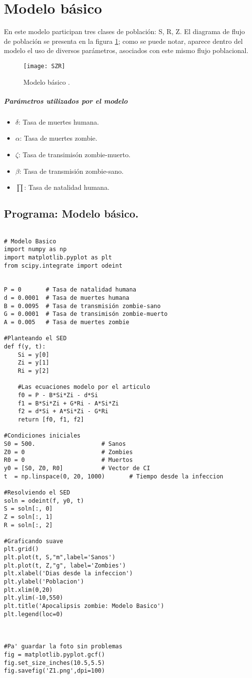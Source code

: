 \documentclass[12pt]{article}
\begin{document}
\section{Modelo básico}
En este modelo participan tres clases de población: S, R, Z. El diagrama de flujo de población se presenta en la figura \ref{SZR}; como se puede notar, aparece dentro del modelo el uso de diversos parámetros, asociados con este mismo flujo poblacional.

\begin{figure}[H]
\centering
 \texttt{[image: SZR]}
 \caption{Modelo básico \cite{Z}.}
 \label{SZR}
\end{figure}

\subparagraph*{Parámetros utilizados por el modelo}
\begin{itemize}
\item $\delta$: Tasa de muertes humana.
\item $\alpha$: Tasa de muertes zombie.
\item $\zeta$: Tasa de transimisón zombie-muerto.
\item $\beta$: Tasa de transmisión zombie-sano.
\item $\prod$: Tasa de natalidad humana.
\end{itemize}

\subsection*{Programa: Modelo básico.}

{\color{RoyalPurple}\begin{verbatim}

# Modelo Basico
import numpy as np
import matplotlib.pyplot as plt
from scipy.integrate import odeint


P = 0       # Tasa de natalidad humana
d = 0.0001  # Tasa de muertes humana
B = 0.0095  # Tasa de transmisión zombie-sano
G = 0.0001  # Tasa de transimisón zombie-muerto
A = 0.005   # Tasa de muertes zombie

#Planteando el SED
def f(y, t):
    Si = y[0]
    Zi = y[1]
    Ri = y[2]
    
    #Las ecuaciones modelo por el articulo
    f0 = P - B*Si*Zi - d*Si
    f1 = B*Si*Zi + G*Ri - A*Si*Zi
    f2 = d*Si + A*Si*Zi - G*Ri
    return [f0, f1, f2]

#Condiciones iniciales
S0 = 500.                   # Sanos
Z0 = 0                      # Zombies
R0 = 0                      # Muertos
y0 = [S0, Z0, R0]           # Vector de CI
t  = np.linspace(0, 20, 1000)       # Tiempo desde la infeccion

#Resolviendo el SED
soln = odeint(f, y0, t)
S = soln[:, 0]
Z = soln[:, 1]
R = soln[:, 2]

#Graficando suave
plt.grid()
plt.plot(t, S,"m",label='Sanos')
plt.plot(t, Z,"g", label='Zombies')
plt.xlabel('Dias desde la infeccion')
plt.ylabel('Poblacion')
plt.xlim(0,20)
plt.ylim(-10,550)
plt.title('Apocalipsis zombie: Modelo Basico')
plt.legend(loc=0)



#Pa' guardar la foto sin problemas
fig = matplotlib.pyplot.gcf()
fig.set_size_inches(10.5,5.5)
fig.savefig('Z1.png',dpi=100)
\end{verbatim}}
\end{document}
